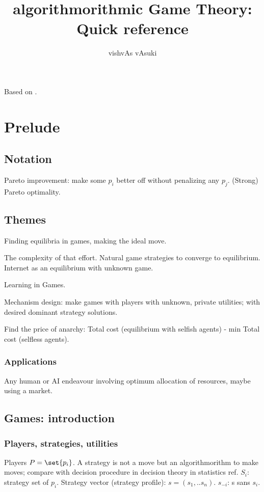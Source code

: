 \documentclass[oneside, article]{memoir}
\title{algorithmorithmic Game Theory: Quick reference}
\author{vishvAs vAsuki}
\begin{document}
\maketitle

Based on \cite{algorithmGameTheory}.

\part{Prelude}
\chapter{Notation}
Pareto improvement: make some $p_{i}$ better off without penalizing any $p_{j}$. (Strong) Pareto optimality.

\chapter{Themes}
Finding equilibria in games, making the ideal move.

The complexity of that effort. Natural game strategies to converge to equilibrium. Internet as an equilibrium with unknown game.

Learning in Games.

Mechanism design: make games with players with unknown, private utilities; with desired dominant strategy solutions.

Find the price of anarchy: Total cost (equilibrium with selfish agents) - min Total cost (selfless agents).

\section{Applications}
Any human or AI endeavour involving optimum allocation of resources, maybe using a market.

\chapter{Games: introduction}
\section{Players, strategies, utilities}
Players $P = \set{p_{i}}$. A strategy is not a move but an algorithmorithm to make moves; compare with decision procedure in decision theory in statistics ref. $S_{i}$: strategy set of $p_{i}$. Strategy vector (strategy profile): $s = (s_{1}, .. s_{n})$. $s_{-i}$: s sans $s_{i}$.
\end{document}
